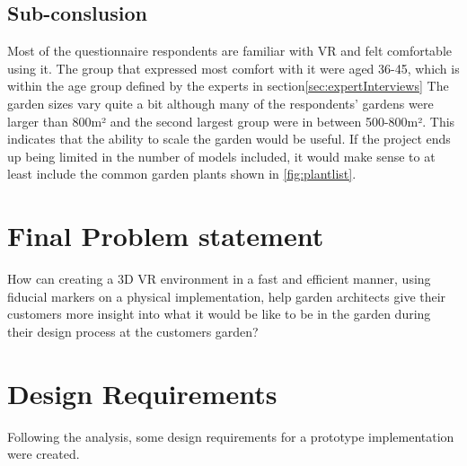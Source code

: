 	\subsection{Sub-conslusion}
	Most of the questionnaire respondents are familiar with VR and felt comfortable using it. The group that expressed most comfort with it were aged 36-45, which is within the age group defined by the experts in section\autoref{sec:expertInterviews}
	The garden sizes vary quite a bit although many of the respondents' gardens were larger than 800m² and the second largest group were in between 500-800m². This indicates that the ability to scale the garden would be useful. If the project ends up being limited in the number of models included, it would make sense to at least include the common garden plants shown in \autoref{fig:plantlist}.

\section{Final Problem statement}\label{sec:FPS}
How can creating a 3D VR environment in a fast and efficient manner, using fiducial markers on a physical implementation, help garden architects give their customers more insight into what it would be like to be in the garden during their design process at the customers garden?

			
			\section{Design Requirements}\label{sec:designRequirements}
			Following the analysis, some design requirements for a prototype implementation were created.
